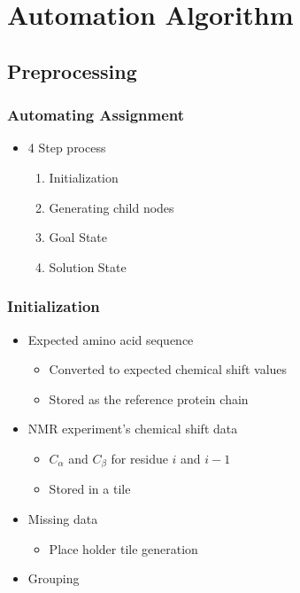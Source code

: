 \documentclass{beamer}
\begin{document}
\section{Automation Algorithm}

\subsection{Preprocessing}
\begin{frame}
\frametitle{Automating Assignment}
	\begin{itemize}
		\item 4 Step process
		\begin{enumerate}
			\item Initialization
			\item Generating child nodes
			\item Goal State
			\item Solution State
		\end{enumerate}
	\end{itemize}
\end{frame}

\begin{frame}
	\frametitle{Initialization}
	\begin{itemize}
		\item Expected amino acid sequence
		\begin{itemize}
			\item Converted to expected chemical shift values
			\item Stored as the reference protein chain
		\end{itemize}
		\item NMR experiment's chemical shift data
		\begin{itemize}
			\item $C_\alpha$ and $C_{\beta}$ for residue $i$ and $i-1$
			\item Stored in a tile
		\end{itemize}
		\item Missing data
		\begin{itemize}
			\item Place holder tile generation
		\end{itemize}
		\item Grouping 
	\end{itemize}
\end{frame}
\end{document}
